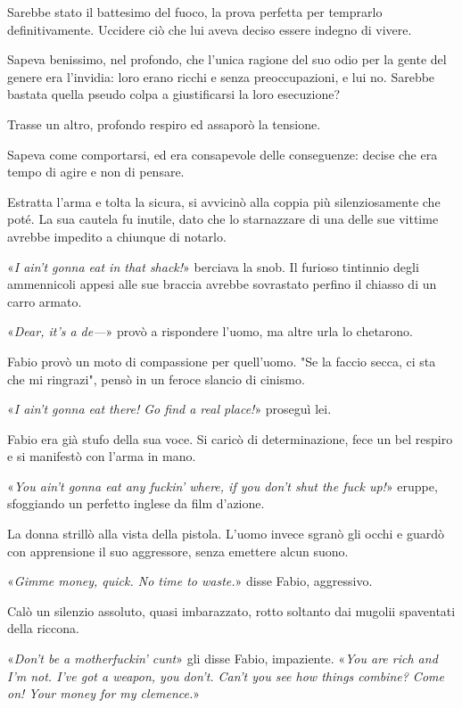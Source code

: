 Sarebbe stato il battesimo del fuoco, la prova perfetta per temprarlo definitivamente. Uccidere ciò che lui aveva deciso essere indegno di vivere.

Sapeva benissimo, nel profondo, che l'unica ragione del suo odio per la gente del genere era l'invidia: loro erano ricchi e senza preoccupazioni, e lui no. Sarebbe bastata quella pseudo colpa a giustificarsi la loro esecuzione?

Trasse un altro, profondo respiro ed assaporò la tensione.

Sapeva come comportarsi, ed era consapevole delle conseguenze: decise che era tempo di agire e non di pensare.

Estratta l'arma e tolta la sicura, si avvicinò alla coppia più silenziosamente che poté. La sua cautela fu inutile, dato che lo starnazzare di una delle sue vittime avrebbe impedito a chiunque di notarlo.

«\emph{I ain't gonna eat in that shack!}» berciava la snob. Il furioso tintinnio degli ammennicoli appesi alle sue braccia avrebbe sovrastato perfino il chiasso di un carro armato.

«\emph{Dear, it's a de---}» provò a rispondere l'uomo, ma altre urla lo chetarono.

Fabio provò un moto di compassione per quell'uomo. "Se la faccio secca, ci sta che mi ringrazi", pensò in un feroce slancio di cinismo.

«\emph{I ain't gonna eat there! Go find a real place!}» proseguì lei.

Fabio era già stufo della sua voce. Si caricò di determinazione, fece un bel respiro e si manifestò con l'arma in mano.

«\emph{You ain't gonna eat any fuckin' where, if you don't shut the fuck up!}» eruppe, sfoggiando un perfetto inglese da film d'azione.

La donna strillò alla vista della pistola. L'uomo invece sgranò gli occhi e guardò con apprensione il suo aggressore, senza emettere alcun suono.

«\emph{Gimme money, quick. No time to waste.}» disse Fabio, aggressivo.

Calò un silenzio assoluto, quasi imbarazzato, rotto soltanto dai mugolii spaventati della riccona.

«\emph{Don't be a motherfuckin' cunt}» gli disse Fabio, impaziente. «\emph{You are rich and I'm not. I've got a weapon, you don't. Can't you see how things combine? Come on! Your money for my clemence.}»

